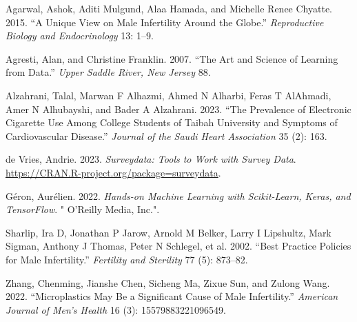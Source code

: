 \documentclass[
]{article}
\newlength{\cslhangindent}
\newenvironment{CSLReferences}[2] %
 {\begin{list}{}{%
  \setlength{\itemindent}{0pt}
  \setlength{\leftmargin}{0pt}
  \setlength{\parsep}{0pt}
  \ifodd #1
   \setlength{\leftmargin}{\cslhangindent}
   \setlength{\itemindent}{-1\cslhangindent}
  \fi
  \setlength{\itemsep}{#2\baselineskip}}}
 {\end{list}}
\begin{document}
\label{refs}
\begin{CSLReferences}{1}{0}
Agarwal, Ashok, Aditi Mulgund, Alaa Hamada, and Michelle Renee Chyatte.
2015. {``A Unique View on Male Infertility Around the Globe.''}
\emph{Reproductive Biology and Endocrinology} 13: 1--9.

Agresti, Alan, and Christine Franklin. 2007. {``The Art and Science of
Learning from Data.''} \emph{Upper Saddle River, New Jersey} 88.

Alzahrani, Talal, Marwan F Alhazmi, Ahmed N Alharbi, Feras T AlAhmadi,
Amer N Alhubayshi, and Bader A Alzahrani. 2023. {``The Prevalence of
Electronic Cigarette Use Among College Students of Taibah University and
Symptoms of Cardiovascular Disease.''} \emph{Journal of the Saudi Heart
Association} 35 (2): 163.

de Vries, Andrie. 2023. \emph{Surveydata: Tools to Work with Survey
Data}. \url{https://CRAN.R-project.org/package=surveydata}.

Géron, Aurélien. 2022. \emph{Hands-on Machine Learning with
Scikit-Learn, Keras, and TensorFlow}. " O'Reilly Media, Inc.".

Sharlip, Ira D, Jonathan P Jarow, Arnold M Belker, Larry I Lipshultz,
Mark Sigman, Anthony J Thomas, Peter N Schlegel, et al. 2002. {``Best
Practice Policies for Male Infertility.''} \emph{Fertility and
Sterility} 77 (5): 873--82.

Zhang, Chenming, Jianshe Chen, Sicheng Ma, Zixue Sun, and Zulong Wang.
2022. {``Microplastics May Be a Significant Cause of Male
Infertility.''} \emph{American Journal of Men's Health} 16 (3):
15579883221096549.

\end{CSLReferences}
\end{document}
